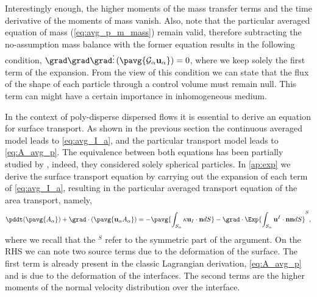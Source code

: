 Interestingly enough, the higher moments of the mass transfer terms and the time derivative of the moments of mass vanish. 
Also, note that the particular averaged equation of mass (\ref{eq:avg_p_m_mass}) remain valid, therefore subtracting the no-assumption mass balance with the former equation results in the following condition, $\grad\grad\grad \vdots \left(\pavg{ \mathcal{G}_\alpha\textbf{u}_\alpha}\right) = 0$, where we keep solely the first term of the expansion. 
From the view of this condition we can state that the flux of the shape of each particle through a control volume must remain null. 
This term can might have a certain importance in inhomogeneous medium. 

In the context of poly-disperse dispersed flows it is essential to derive an equation for surface transport. 
As shown in the previous section the continuous averaged model leads to \ref{eq:avg_I_a}, and the particular transport model leads to \ref{eq:A_avg_p}. 
The equivalence between both equations has been partially studied by \citep{lhuillier2000bilan}, indeed, they considered solely spherical particles. 
In \ref{ap:exp} we derive the surface transport equation by carrying out the expansion of each term of \ref{eq:avg_I_a}, resulting in the particular averaged transport equation of the area transport, namely, 
\begin{equation}
    \pddt (\pavg{A_\alpha})
    + \grad \cdot (\pavg{\textbf{u}_\alpha A_\alpha})
    = -\pavg{\int_{S_\alpha} \kappa\textbf{u}_I\cdot \textbf{n} dS }\\
    - \grad \cdot \Exp{\int_{S_\alpha} \textbf{u}^I \cdot\textbf{nn} dS}^S,
    \label{eq:hybrid_area}
\end{equation}
where we recall that the $^S$ refer to the symmetric part of the argument. 
On the RHS we can note two source terms due to the deformation of the surface. 
The first term is already present in the classic Lagrangian derivation, \ref{eq:A_avg_p} and is due to the deformation of the interfaces. 
The second  terms are the higher moments of the normal velocity distribution over the interface. 

